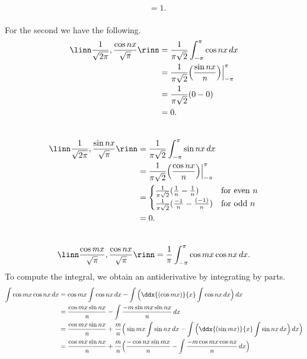 \documentclass[12pt, letterpaper]{hmcpset}
\begin{document}
\begin{solution}
\[\begin{split}
											   & = 1.
		\end{split}
	\]\\
	For the second we have the following.
	\[
		\begin{split}
			\linn \frac{1}{\sqrt{2 \pi}}, \frac{\cos{nx}}{\sqrt{\pi}} \rinn  & = \frac{1}{\pi \sqrt 2}\int_{-\pi}^\pi \cos{nx} \, dx \\
											 & = \frac{1}{\pi \sqrt 2} \Big ( \frac{\sin{nx}}{n} \Big ) \Big |_{-\pi}^\pi \\
											 & = \frac{1}{\pi \sqrt 2} (0 - 0) \\
											 & = 0.
		\end{split}
	\]\\
	\[
		\begin{split}
			\linn \frac{1}{\sqrt{2 \pi}}, \frac{\sin{nx}}{\sqrt \pi} \rinn & = \frac{1}{\pi \sqrt 2} \int_{-\pi}^\pi \sin{nx} \, dx \\
										       & = \frac{1}{\pi \sqrt 2} \Big ( \frac{\cos{nx}}{n} \Big ) \Big |_{- \pi}^\pi \\
										       & = \begin{cases}
											       \frac{1}{\pi \sqrt 2} (\frac{1}{n} - \frac{1}{n}) & \text{for even } n \\
											       \frac{1}{\pi \sqrt 2} (\frac{-1}{n} - \frac{(-1)}{n}) & \text{for odd } n
										       \end{cases} \\
										       & = 0.
		\end{split}
	\]\\
	\[
		\linn \frac{\cos{mx}}{\sqrt \pi}, \frac{\cos{nx}}{\sqrt \pi} \rinn = \frac{1}{\pi} \int_{-\pi}^\pi \cos{mx} \cos{nx} \, dx.
	\]
	To compute the integral, we obtain an antiderivative by integrating by parts.
	\[
		\begin{split}
			\int \cos{mx} \cos{nx} \, dx & = \cos{mx} \int \cos{nx} \, dx - \int \Big ( \ddx{(\cos{mx})}{x} \int \cos{nx} \, dx \Big ) \, dx \\
						     & = \frac{\cos{mx} \sin{nx}}{n} - \int \frac{- m \sin{mx} \sin{nx}}{n} \, dx \\
						     & = \frac{\cos{mx \sin{nx}}}{n} + \frac{m}{n} \Big ( \sin{mx} \int \sin{nx} \, dx - \int \Big ( \ddx{(\sin{mx})}{x} \int \sin{nx} \, dx \Big ) \, dx \Big ) \\
						     & = \frac{\cos{mx} \sin{nx}}{n} + \frac{m}{n} \Big ( \frac{- \cos{nx} \sin{mx}}{n} - \int \frac{-m \cos{mx} \cos{nx}}{n} \, dx \Big ) \\

\end{split}\]
\end{solution}
\end{document}
